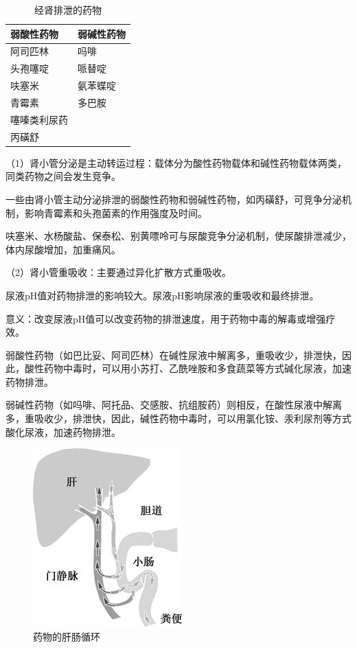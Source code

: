 \begin{table}[htbp]
\centering
\caption{经肾排泄的药物}
\label{tab3-3}
\begin{tabular}{ll} 
\toprule
弱酸性药物 & 弱碱性药物  \\
\midrule
阿司匹林                                            & 吗啡     \\
头孢噻啶                                            & 哌替啶    \\
呋塞米                                             & 氨苯蝶啶   \\
青霉素                                             & 多巴胺    \\
噻嗪类利尿药                                          &        \\
丙磺舒                                             &        \\
\bottomrule
\end{tabular}
\end{table}

（1）肾小管分泌是主动转运过程：载体分为酸性药物载体和碱性药物载体两类，同类药物之间会发生竞争。

一些由肾小管主动分泌排泄的弱酸性药物和弱碱性药物，如丙磺舒，可竞争分泌机制，影响青霉素和头孢菌素的作用强度及时间。

呋塞米、水杨酸盐、保泰松、别黄嘌呤可与尿酸竞争分泌机制，使尿酸排泄减少，体内尿酸增加，加重痛风。

（2）肾小管重吸收：主要通过异化扩散方式重吸收。

尿液pH值对药物排泄的影响较大。尿液pH影响尿液的重吸收和最终排泄。

意义：改变尿液pH值可以改变药物的排泄速度，用于药物中毒的解毒或增强疗效。

弱酸性药物（如巴比妥、阿司匹林）在碱性尿液中解离多，重吸收少，排泄快，因此，酸性药物中毒时，可以用小苏打、乙酰唑胺和多食蔬菜等方式碱化尿液，加速药物排泄。

弱碱性药物（如吗啡、阿托品、交感胺、抗组胺药）则相反，在酸性尿液中解离多，重吸收少，排泄快，因此，碱性药物中毒时，可以用氯化铵、汞利尿剂等方式酸化尿液，加速药物排泄。

\begin{figure}[!htbp]
 \centering
 \includegraphics{./images/Image00043.jpg}
 \captionsetup{justification=centering}
 \caption{药物的肝肠循环}
 \label{fig3-13}
  \end{figure} 

